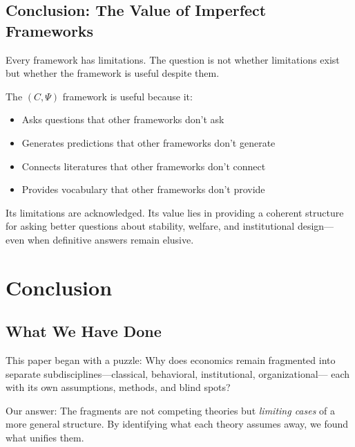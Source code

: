 \documentclass[12pt,a4paper]{article}
\begin{document}
\subsection{Conclusion: The Value of Imperfect Frameworks}

Every framework has limitations. The question is not whether limitations exist
but whether the framework is useful despite them.

The $(C, \Psi)$ framework is useful because it:
\begin{itemize}
  \item Asks questions that other frameworks don't ask
  \item Generates predictions that other frameworks don't generate
  \item Connects literatures that other frameworks don't connect
  \item Provides vocabulary that other frameworks don't provide
\end{itemize}

Its limitations are acknowledged. Its value lies in providing
a coherent structure for asking better questions about
stability, welfare, and institutional design---
even when definitive answers remain elusive.

\section{Conclusion}
\label{sec:conclusion}

\subsection{What We Have Done}

This paper began with a puzzle: Why does economics remain fragmented
into separate subdisciplines---classical, behavioral, institutional, organizational---
each with its own assumptions, methods, and blind spots?

Our answer: The fragments are not competing theories but \emph{limiting cases}
of a more general structure. By identifying what each theory assumes away,
we found what unifies them.
\end{document}
